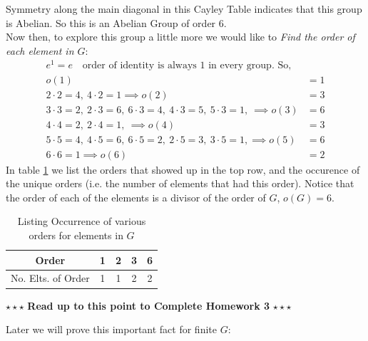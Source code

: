 \begin{example}
\noindent Symmetry along the main diagonal in this Cayley Table indicates that this group is Abelian. So this is an Abelian Group of order 6. \steezybreak\\
\noindent Now then, to explore this group a little more we would like to \textit{Find the order of each element in $G$}:
\begin{align}
    e^1=e \ \ \ \text{ order of identity is always 1 in every group. So,}  \nonumber \\
    o(1)&=1  \nonumber \\
    2\cdot 2= 4, \ 4\cdot 2= 1 \implies o(2)&=3 \nonumber \\
    3\cdot 3= 2, \ 2\cdot 3= 6, \ 6\cdot 3=4,\ 4\cdot 3= 5,\ 5\cdot 3= 1,\ \implies  o(3)&=6 \nonumber \\
    4\cdot 4= 2,\ 2\cdot 4= 1, \ \implies o(4)&=3 \nonumber \\
    5\cdot 5= 4, \ 4\cdot 5= 6, \ 6\cdot 5=2,\ 2\cdot 5= 3,\ 3\cdot 5= 1, \implies o(5)&=6 \nonumber \\
    6\cdot 6 = 1 \implies o(6)&=2  \nonumber
\end{align}
In table \ref{tab:order_occur} we list the orders that showed up in the top row, and the occurence of the unique orders (i.e. the number of elements that had this order). Notice that the order of each of the elements is a divisor of the order of $G$, $o(G)=6$.  
\begin{table}[h!]
    \centering
    \begin{tabular}{|c|c|c|c|c|}\hline
         Order&1&2&3&6   \\ \hline
         No. Elts. of Order& 1&1&2&2 \\ \hline
    \end{tabular}
    \caption{Listing Occurrence of various orders for elements in $G$}
    \label{tab:order_occur}
\end{table}
\end{example}
\steezybreak
\begin{tcolorbox}
\begin{center}
    $\star\star\star$ \textbf{Read up to this point to Complete Homework 3} $\star\star\star$
\end{center}
\end{tcolorbox}
\steezybreak
\newpage
\noindent Later we will prove this important fact for finite $G$:
